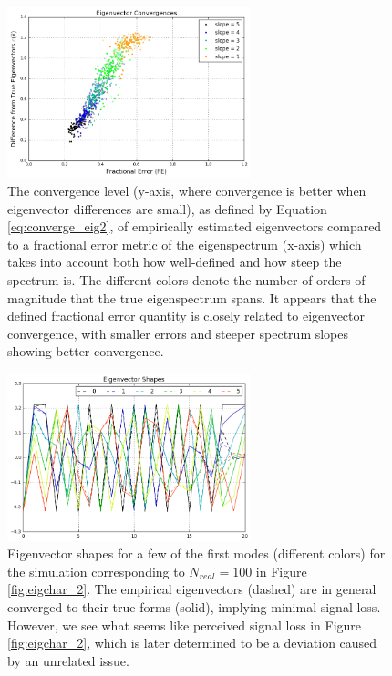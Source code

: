 \begin{figure}
    \centering
	\includegraphics[width=0.63\textwidth]{plots/eigchar_1.png}    
	\caption{The convergence level (y-axis, where convergence is better when eigenvector differences are small), as defined by Equation \eqref{eq:converge_eig2}, of empirically estimated eigenvectors compared to a fractional error metric of the eigenspectrum (x-axis) which takes into account both how well-defined and how steep the spectrum is. The different colors denote the number of orders of magnitude that the true eigenspectrum spans. It appears that the defined fractional error quantity is closely related to eigenvector convergence, with smaller errors and steeper spectrum slopes showing better convergence.}
    \label{fig:eigchar_1}
\end{figure}

\begin{figure}
    \centering
	\includegraphics[width=0.63\textwidth]{plots/eigchar_3.png}    
	\caption{Eigenvector shapes for a few of the first modes (different colors) for the simulation corresponding to $N_{real}=100$ in Figure \ref{fig:eigchar_2}. The empirical eigenvectors (dashed) are in general converged to their true forms (solid), implying minimal signal loss. However, we see what seems like perceived signal loss in Figure \ref{fig:eigchar_2}, which is later determined to be a deviation caused by an unrelated issue.}
    \label{fig:eigchar_3}
\end{figure}

